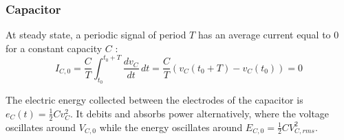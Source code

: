 		\subsubsection{Capacitor}
		At steady state, a periodic signal of period $T$ has an average current equal to 0 for a constant capacity $C$ : 
		\begin{equation}
			I_{C,0} = \frac{C}{T}\int _{t_0}^{t_0+T} \frac{dv_C}{dt} \, dt = \frac{C}{T} (v_{C}(t_0+T)-v_C(t_0)) = 0
		\end{equation}
		
		The electric energy collected between the electrodes of the capacitor is $e_C(t) = \frac{1}{2}Cv^2_C$. It debits and absorbs power alternatively, where the voltage oscillates around $V_{C,0}$ while the energy oscillates around $E_{C,0} = \frac{1}{2} C V_{C,rms}^2$. 